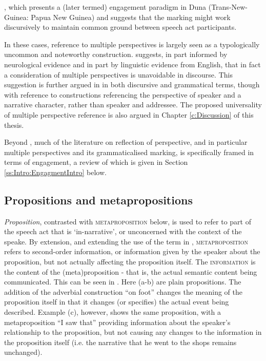 , which presents a (later termed) engagement paradigm in Duna (Trans-New-Guinea: Papua New Guinea) and suggests that the marking might work discursively to maintain common ground between speech act participants.

In these cases, reference to multiple perspectives is largely seen as a typologically uncommon and noteworthy construction.  suggests, in part informed by neurological evidence and in part by linguistic evidence from English, that in fact a consideration of multiple perspectives is unavoidable in discourse. This suggestion is further argued in  in both discursive and grammatical terms, though with reference to constructions referencing the perspective of speaker and a narrative character, rather than speaker and addressee. The proposed universality of multiple perspective reference is also argued in Chapter \ref{c:Discussion} of this thesis. 

Beyond , much of the literature on reflection of perspective, and in particular multiple perspectives and its grammaticalised marking, is specifically framed in terms of engagement, a review of which is given in Section \ref{ss:Intro:EngagmentIntro} below.

\subsection{Propositions and metapropositions}
\textit{Proposition}, contrasted with \textsc{metaproposition} below, is used to refer to part of the speech act that is `in-narrative', or unconcerned with the context of the speake. By extension, and extending the use of the term in , \textsc{metaproposition} refers to second-order information, or information given by the speaker about the proposition, but not actually affecting the proposition itself. The \textsc{information} is the content of the (meta)proposition - that is, the actual semantic content being communicated. This can be seen in . Here (a-b) are plain propositions. The addition of the adverbial construction ``on foot'' changes the meaning of the proposition itself in that it changes (or specifies) the actual event being described. Example (c), however, shows the same proposition, with a metaproposition ``I saw that'' providing information about the speaker's relationship to the proposition, but not causing any changes to the information in the proposition itself (i.e. the narrative that he went to the shops remains unchanged).

